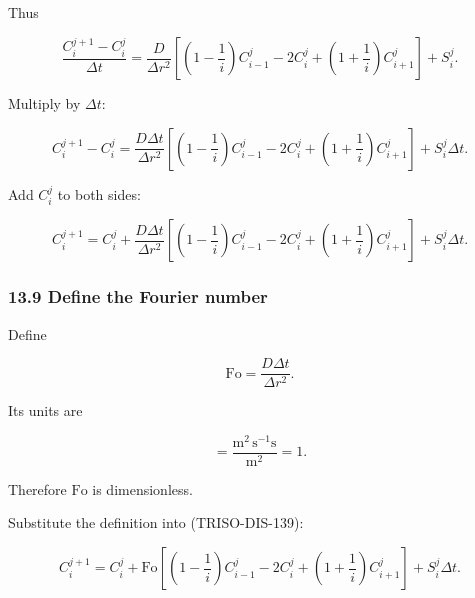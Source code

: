 \documentclass[11pt,a4paper]{article}
\begin{document}
Thus

\begin{equation}
\frac{
C_i^{j+1}-C_i^j
}{
\Delta t
}
=
\frac{D}{\Delta r^2}
\left[
\left(
1-\frac1i
\right)C_{i-1}^j
-
2C_i^j
+
\left(
1+\frac1i
\right)C_{i+1}^j
\right]
+
S_i^j.
\tag{TRISO-DIS-137}
\label{eq:triso-dis-137}
\end{equation}

Multiply by $\Delta t$:

\begin{equation}
C_i^{j+1}-C_i^j
=
\frac{D\Delta t}{\Delta r^2}
\left[
\left(
1-\frac1i
\right)C_{i-1}^j
-
2C_i^j
+
\left(
1+\frac1i
\right)C_{i+1}^j
\right]
+
S_i^j\Delta t.
\tag{TRISO-DIS-138}
\label{eq:triso-dis-138}
\end{equation}

Add $C_i^j$ to both sides:

\begin{equation}
C_i^{j+1}
=
C_i^j
+
\frac{D\Delta t}{\Delta r^2}
\left[
\left(
1-\frac1i
\right)C_{i-1}^j
-
2C_i^j
+
\left(
1+\frac1i
\right)C_{i+1}^j
\right]
+
S_i^j\Delta t.
\tag{TRISO-DIS-139}
\label{eq:triso-dis-139}
\end{equation}

\subsubsection*{13.9 Define the Fourier number}

Define

\begin{equation}
\boxed{
\mathrm{Fo}
=
\frac{D\Delta t}{\Delta r^2}.
}
\tag{TRISO-DIS-140}
\label{eq:triso-dis-140}
\end{equation}

Its units are

\begin{equation}
[\mathrm{Fo}]
=
\frac{
\mathrm{m^2\,s^{-1}}\mathrm{s}
}{
\mathrm{m^2}
}
=
1.
\tag{TRISO-DIS-141}
\label{eq:triso-dis-141}
\end{equation}

Therefore $\mathrm{Fo}$ is dimensionless.

Substitute the definition into (TRISO-DIS-139):

\begin{equation}
C_i^{j+1}
=
C_i^j
+
\mathrm{Fo}
\left[
\left(
1-\frac1i
\right)C_{i-1}^j
-
2C_i^j
+
\left(
1+\frac1i
\right)C_{i+1}^j
\right]
+
S_i^j\Delta t.
\tag{TRISO-DIS-142}
\label{eq:triso-dis-142}
\end{equation}
\end{document}
